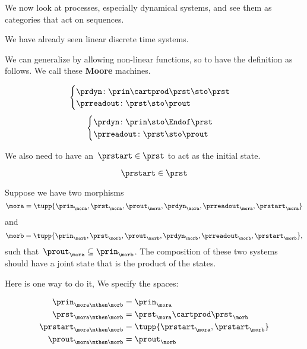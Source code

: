 We now look at processes, especially dynamical systems, and see them as categories that act on sequences.

We have already seen linear discrete time systems.

We can generalize by allowing non-linear functions, so to have
the definition as follows. We call these \textbf{Moore} machines.

\begin{equation}\label{eq:moore-1}
    \begin{cases}
    \prdyn \colon \prin \cartprod \prst \sto \prst \\
    \prreadout \colon \prst \sto \prout
    \end{cases}
\end{equation}
\begin{equation}\label{eq:moore-1-endo}
  \begin{cases}
  \prdyn \colon \prin \sto \Endof \prst \\
  \prreadout \colon \prst \sto \prout
  \end{cases}
\end{equation}


We also need to have an~$\prstart \in \prst$ to act as the initial state.
\begin{forslides}
  \begin{equation}\label{eq:moore-start}
    \prstart \in \prst
  \end{equation}
\end{forslides}
Suppose we have two morphisms
\begin{equation}\label{eq:moore-mora}
  \mora = \tupp{\prin_{\mora},\prst_{\mora},\prout_{\mora},\prdyn_{\mora},\prreadout_{\mora},\prstart_{\mora}}
\end{equation}
and
\begin{equation}\label{eq:moore-morb}
\morb = \tupp{\prin_{\morb},\prst_{\morb},\prout_{\morb},\prdyn_{\morb},\prreadout_{\morb},\prstart_{\morb}},
\end{equation}
such that~$\prout_{\mora} \subseteq \prin_{\morb}$. The composition of these two systems should have a joint state that is the product of the states.

Here is one way to do it, We specify the spaces:

\begin{equation}\label{eq:moore-comp-naive-1}
  \begin{aligned}
  \prin_{\mora\mthen\morb} &= \prin_{\mora}   \\
  \prst_{\mora\mthen\morb} &= \prst_{\mora} \cartprod \prst_{\morb} \\
  \prstart_{\mora\mthen\morb} &= \tupp{\prstart_{\mora}, \prstart_{\morb}} \\
  \prout_{\mora\mthen\morb} &= \prout_{\morb}
  \end{aligned}
\end{equation}

